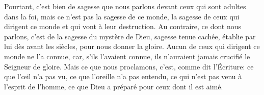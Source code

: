 Pourtant, c’est bien de sagesse
		que nous parlons devant ceux qui sont adultes dans la foi,
	mais ce n’est pas la sagesse de ce monde,
	la sagesse de ceux qui dirigent ce monde et qui vont à leur destruction.
Au contraire, ce dont nous parlons, c’est de la sagesse du mystère de Dieu,
	sagesse tenue cachée, établie par lui dès avant les siècles,
	pour nous donner la gloire.
Aucun de ceux qui dirigent ce monde ne l’a connue,
	car, s’ils l’avaient connue,
	ils n’auraient jamais crucifié le Seigneur de gloire.
Mais ce que nous proclamons, c’est, comme dit l’Écriture:
	ce que l’œil n’a pas vu, ce que l’oreille n’a pas entendu,
	ce qui n’est pas venu à l’esprit de l’homme,
	ce que Dieu a préparé pour ceux dont il est aimé.
